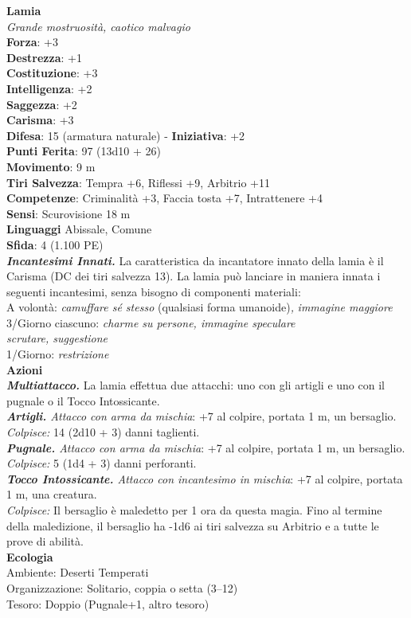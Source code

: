 \begin{multicols}{2}
\medskip\textbf{Lamia}\\
\emph{Grande mostruosità, caotico malvagio}\\
\textbf{Forza}: +3\\
\textbf{Destrezza}: +1\\
\textbf{Costituzione}: +3\\
\textbf{Intelligenza}: +2\\
\textbf{Saggezza}: +2\\
\textbf{Carisma}: +3\\
\textbf{Difesa}: 15 (armatura naturale) - \textbf{Iniziativa}: +2\\
\textbf{Punti Ferita}: 97 (13d10 + 26)\\
\textbf{Movimento}: 9 m\\
\textbf{Tiri Salvezza}: Tempra +6, Riflessi +9, Arbitrio +11\\
\textbf{Competenze}: Criminalità +3, Faccia tosta +7, Intrattenere +4\\
\textbf{Sensi}: Scurovisione 18 m\\
\textbf{Linguaggi} Abissale, Comune\\
\textbf{Sfida}: 4 (1.100 PE)\smallskip\\
\emph{\textbf{Incantesimi Innati.}} La caratteristica da incantatore innato della lamia è il Carisma (DC dei tiri salvezza 13). La lamia può lanciare in maniera innata i seguenti incantesimi, senza bisogno di componenti materiali:\\
A volontà: \emph{camuffare sé stesso} (qualsiasi forma umanoide)\emph{,} \emph{immagine maggiore}\\
3/Giorno ciascuno: \emph{charme su persone, immagine speculare}\\
\emph{scrutare, suggestione}\\
1/Giorno: \emph{restrizione}\\
\smallskip\textbf{Azioni}\\
\emph{\textbf{Multiattacco.}} La lamia effettua due attacchi: uno con gli artigli e uno con il pugnale o il Tocco Intossicante.\\
\emph{\textbf{Artigli.} Attacco con arma da mischia}: +7 al colpire, portata 1 m, un bersaglio.\\
\emph{Colpisce:} 14 (2d10 + 3) danni taglienti.\\
\emph{\textbf{Pugnale.} Attacco con arma da mischia}: +7 al colpire, portata 1 m, un bersaglio.\\
\emph{Colpisce:} 5 (1d4 + 3) danni perforanti.\\
\emph{\textbf{Tocco Intossicante.} Attacco con incantesimo in mischia}: +7 al colpire, portata 1 m, una creatura.\\
\emph{Colpisce:} Il bersaglio è maledetto per 1 ora da questa magia. Fino al termine della maledizione, il bersaglio ha -1d6 ai tiri salvezza su Arbitrio e a tutte le prove di abilità.\\
\textbf{Ecologia}\\
Ambiente: Deserti Temperati\\
Organizzazione: Solitario, coppia o setta (3–12)\\
Tesoro: Doppio (Pugnale+1, altro tesoro)\\


\end{multicols}

